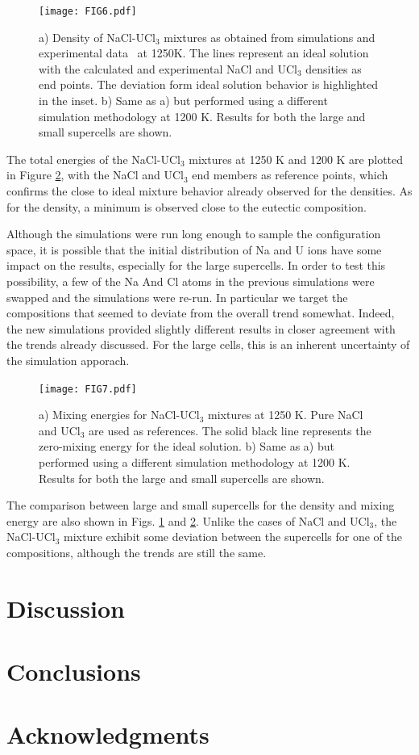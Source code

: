 \documentclass[preprint,3p,10pt,twocolumn,number,sort&compress]{elsarticle}
\begin{document}
\begin{figure}[htb]
\centering
\texttt{[image: FIG6.pdf]}
\caption{a) Density of NaCl-UCl$_3$ mixtures as obtained from simulations and experimental data~\cite{} at 1250K. The lines represent an ideal solution with the calculated and experimental NaCl and UCl$_3$ densities as end points. The deviation form ideal solution behavior is highlighted in the inset. b) Same as a) but performed using a different simulation methodology at 1200 K. Results for both the large and small supercells are shown.} 
\label{fig:NaClUCl3}
\end{figure}

The total energies of the NaCl-UCl$_3$ mixtures at 1250 K and 1200 K are plotted in Figure \ref{fig:NaClUCl3e}, with the NaCl and UCl$_3$ end members as reference points, which confirms the close to ideal mixture behavior already observed for the densities. As for the density, a minimum is observed close to the eutectic composition. 

Although the simulations were run long enough to sample the configuration space, it is possible that the initial distribution of Na and U ions have some impact on the results, especially for the large supercells.  In order to test this possibility, a few of the Na And Cl atoms in the previous simulations were swapped and the simulations were re-run. In particular we target the compositions that seemed to deviate from the overall trend somewhat. Indeed, the new simulations provided slightly different results in closer agreement with the trends already discussed. For the large cells, this is an inherent uncertainty of the simulation apporach.

\begin{figure}[htb]
\centering
\texttt{[image: FIG7.pdf]}
\caption{a) Mixing energies for NaCl-UCl$_3$ mixtures at 1250 K. Pure NaCl and UCl$_3$ are used as references. The solid black line represents the zero-mixing energy for the ideal solution. b) Same as a) but performed using a different simulation methodology at 1200 K. Results for both the large and small supercells are shown.} 
\label{fig:NaClUCl3e}
\end{figure}

The comparison between large and small supercells for the density and mixing energy are also shown in Figs. \ref{fig:NaClUCl3} and \ref{fig:NaClUCl3e}. Unlike the cases of NaCl and UCl$_3$, the NaCl-UCl$_3$ mixture exhibit some deviation between the supercells for one of the compositions, although the trends are still the same. 

\section{Discussion}
\label{sec:discussion}

\section{Conclusions}
\label{sec:conclusions}


\section{Acknowledgments}





\end{document}
